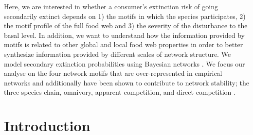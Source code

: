 \documentclass[12pt]{article}
\begin{document}
\begin{spacing}{2.0}
    

    Here, we are interested in whether a consumer's extinction risk of going secondarily extinct depends on 1) the motifs in which the species participates, 2) the motif profile of the full food web and 3) the severity of the disturbance to the basal level. %
    In addition, we want to understand how the information provided by motifs is related to other global and local food web properties in order to better synthesize information provided by different scales of network structure.
    We model secondary extinction probabilities using Bayesian networks \citep{Eklof2013, Haussler2020}. 
    We focus our analyse on the four network motifs that are over-represented in empirical networks and additionally have been shown to contribute to network stability; the three-species chain, omnivory, apparent competition, and direct competition \citep{Stouffer2007, Borrelli2015a, giling2019plant}.
   
    
      



\section*{Introduction} %


\end{spacing}
\end{document}
